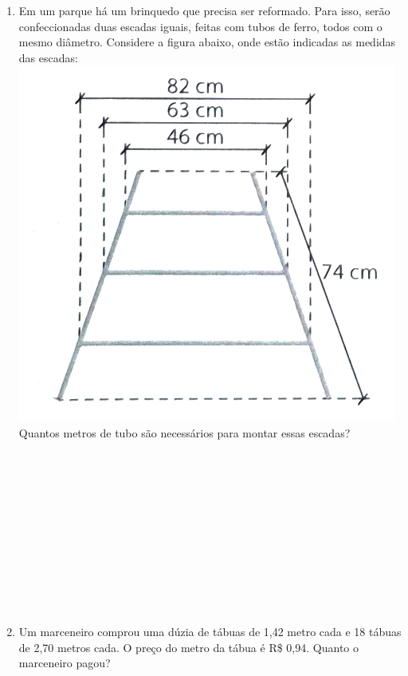 \documentclass[a4paper,14pt]{article}
\begin{document}
\begin{multicols}{2}
\begin{enumerate}
\begin{enumerate}[a)]
    		\end{enumerate}
    		\item Em um parque há um brinquedo que precisa ser reformado. Para isso, serão confeccionadas duas escadas iguais, feitas com tubos de ferro, todos com o mesmo diâmetro. Considere a figura abaixo, onde estão indicadas as medidas das escadas:
    		\includegraphics[width=1\linewidth]{6FMA57_imagens/imagem2}
    		Quantos metros de tubo são necessários para montar essas escadas? \\\\\\\\\\\\\\\\\\\\\\\\
    		\item Um marceneiro comprou uma dúzia de tábuas de 1,42 metro cada e 18 tábuas de 2,70 metros cada. O preço do metro da tábua é R\$ 0,94. Quanto o marceneiro pagou? \\\\\\\\\\\\\\\\\\\\\\\\\\\\\\\\

\end{enumerate}
\end{multicols}
\end{document}
